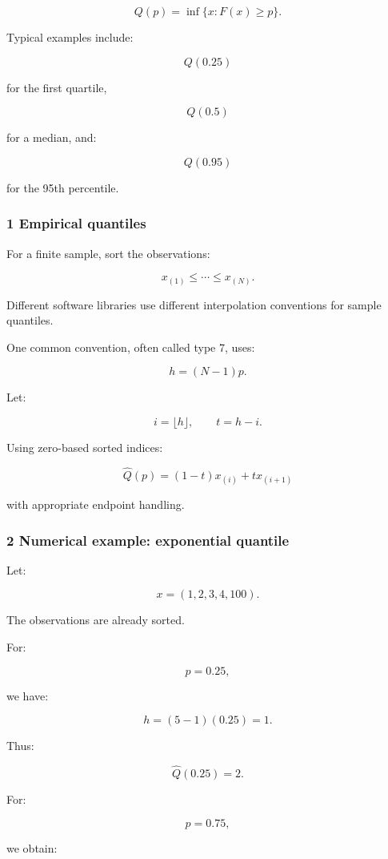 \[
 \boxed{ Q(p)=\inf\{x:F(x)\ge p\} }.
\]

Typical examples include:

\[
 Q(0.25)
\]

for the first quartile,

\[
 Q(0.5)
\]

for a median, and:

\[
 Q(0.95)
\]

for the 95th percentile.

\subsubsection{1 Empirical quantiles}\label{02-foundations-ii-ch030-empirical-quantiles}

For a finite sample, sort the observations:

\[
 x_{(1)}\le\cdots\le x_{(N)}.
\]

Different software libraries use different interpolation conventions for sample quantiles.

One common convention, often called type 7, uses:

\[
 h=(N-1)p.
\]

Let:

\[
 i=\lfloor h\rfloor, \qquad t=h-i.
\]

Using zero-based sorted indices:

\[
 \boxed{ \hat Q(p)=(1-t)x_{(i)}+t x_{(i+1)} }
\]

with appropriate endpoint handling.

\subsubsection{2 Numerical example: exponential quantile}\label{02-foundations-ii-ch030-numerical-example-exponential-quantile}

Let:

\[
 x=(1,2,3,4,100).
\]

The observations are already sorted.

For:

\[
 p=0.25,
\]

we have:

\[
 h=(5-1)(0.25)=1.
\]

Thus:

\[
 \hat Q(0.25)=2.
\]

For:

\[
 p=0.75,
\]

we obtain:

